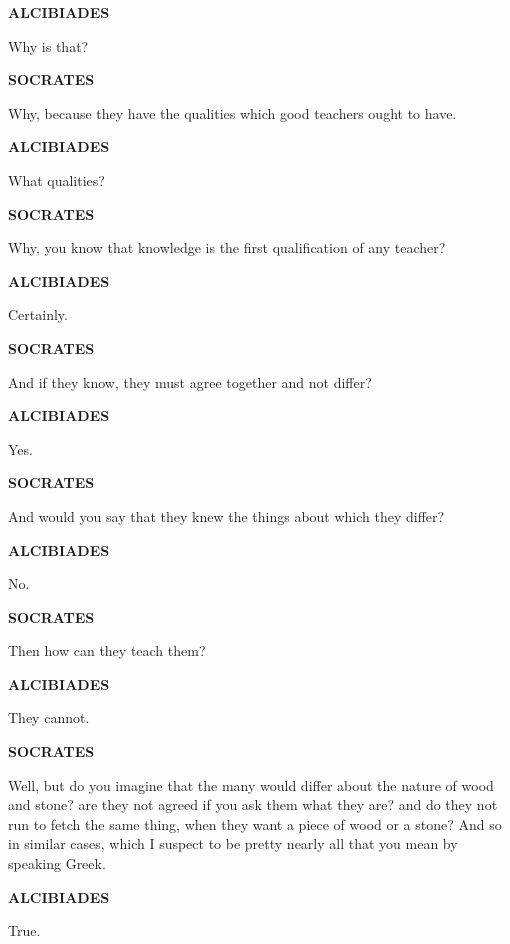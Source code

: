 \documentclass[11pt,letter]{article}
\begin{document}
\par \textbf{ALCIBIADES}
\par   Why is that?

\par \textbf{SOCRATES}
\par   Why, because they have the qualities which good teachers ought to have.

\par \textbf{ALCIBIADES}
\par   What qualities?

\par \textbf{SOCRATES}
\par   Why, you know that knowledge is the first qualification of any teacher?

\par \textbf{ALCIBIADES}
\par   Certainly.

\par \textbf{SOCRATES}
\par   And if they know, they must agree together and not differ?

\par \textbf{ALCIBIADES}
\par   Yes.

\par \textbf{SOCRATES}
\par   And would you say that they knew the things about which they differ?

\par \textbf{ALCIBIADES}
\par   No.

\par \textbf{SOCRATES}
\par   Then how can they teach them?

\par \textbf{ALCIBIADES}
\par   They cannot.

\par \textbf{SOCRATES}
\par   Well, but do you imagine that the many would differ about the nature of wood and stone? are they not agreed if you ask them what they are? and do they not run to fetch the same thing, when they want a piece of wood or a stone? And so in similar cases, which I suspect to be pretty nearly all that you mean by speaking Greek.

\par \textbf{ALCIBIADES}
\par   True.
\end{document}
